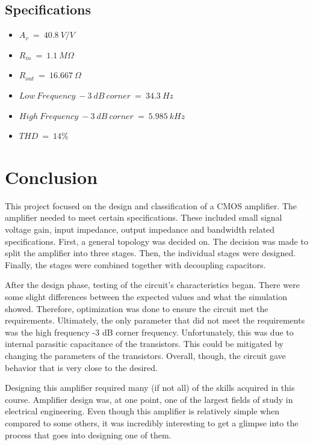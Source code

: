 \documentclass{article}
\begin{document}
\subsection{Specifications}
\begin{itemize}
    \item $A_v\ =\ 40.8\ V/V$
    \item $R_{in}\ =\ 1.1\ M\Omega$
    \item $R_{out}\ =\ 16.667\ \Omega$
    \item $Low\ Frequency\ -3\ dB\ corner\ =\ 34.3\ Hz$
    \item $High\ Frequency\ -3\ dB\ corner\ =\ 5.985\ kHz$
    \item $THD\ =\ 14\%$
\end{itemize}
\section{Conclusion}
\quad \quad This project focused on the design and classification of a CMOS amplifier. The amplifier needed to meet certain specifications. These included small signal voltage gain, input impedance, output impedance and bandwidth related specifications. First, a general topology was decided on. The decision was made to split the amplifier into three stages. Then, the individual stages were designed. Finally, the stages were combined together with decoupling capacitors. \\
\par
\quad \quad After the design phase, testing of the circuit's characteristics began. There were some slight differences between the expected values and what the simulation showed. Therefore, optimization was done to ensure the circuit met the requirements. Ultimately, the only parameter that did not meet the requirements was the high frequency -3 dB corner frequency. Unfortunately, this was due to internal parasitic capacitance of the transistors. This could be mitigated by changing the parameters of the transistors. Overall, though, the circuit gave behavior that is very close to the desired. \\
\par
\quad \quad Designing this amplifier required many (if not all) of the skills acquired in this course. Amplifier design was, at one point, one of the largest fields of study in electrical engineering. Even though this amplifier is relatively simple when compared to some others, it was incredibly interesting to get a glimpse into the process that goes into designing one of them. 
\end{document}
